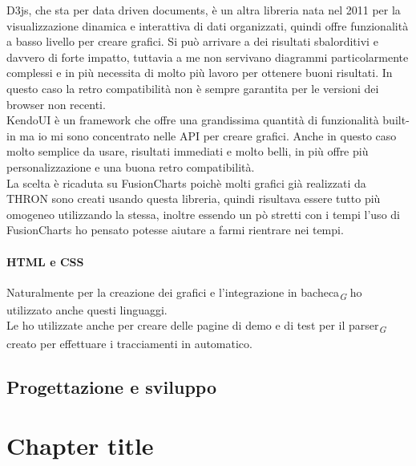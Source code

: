 \documentclass[a4paper, 12pt, twoside, openright]{book}
\newcommand{\gloss}[1]{#1\textsubscript{\textit{\tiny{G}}}}
\begin{document}
D3js, che sta per data driven documents, è un altra libreria nata nel 2011 per la visualizzazione dinamica e interattiva di dati organizzati, quindi offre funzionalità a basso livello per creare grafici. Si può arrivare a dei risultati sbalorditivi e davvero di forte impatto, tuttavia a me non servivano diagrammi particolarmente complessi e in più necessita di molto più lavoro per ottenere buoni risultati. In questo caso la retro compatibilità non è sempre garantita per le versioni dei browser non recenti.\\
KendoUI è un framework che offre una grandissima quantità di funzionalità built-in ma io mi sono concentrato nelle API per creare grafici. Anche in questo caso molto semplice da usare, risultati immediati e molto belli, in più offre più personalizzazione e una buona retro compatibilità.\\
La scelta è ricaduta su FusionCharts poichè molti grafici già realizzati da THRON sono creati usando questa libreria, quindi risultava essere tutto più omogeneo utilizzando la stessa, inoltre essendo un pò stretti con i tempi l'uso di FusionCharts ho pensato potesse aiutare a farmi rientrare nei tempi.\\

\subsubsection{HTML e CSS}
Naturalmente per la creazione dei grafici e l'integrazione in \gloss{bacheca} ho utilizzato anche questi linguaggi.\\Le ho utilizzate anche per creare delle pagine di demo e di test per il \gloss{parser} creato per effettuare i tracciamenti in automatico.



\section{Progettazione e sviluppo}

\chapter{Chapter title} %
\thispagestyle{empty}
\end{document}
